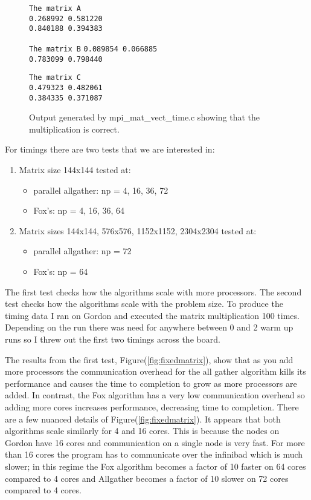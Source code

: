 \documentclass[11pt,a4paper,oneside]{report}
\begin{document}
\begin{figure}[htpb]
  \texttt{The matrix A\\}
  \texttt{0.268992 0.581220 \\}
  \texttt{0.840188 0.394383 \\}

  \texttt{The matrix B}
  \texttt{0.089854 0.066885 \\}
  \texttt{0.783099 0.798440 \\}

  \texttt{The matrix C\\}
  \texttt{0.479323 0.482061 \\}
  \texttt{0.384335 0.371087 \\}
  \caption{Output generated by mpi\_mat\_vect\_time.c showing that the multiplication is correct.}
  \label{fig:allgather}
\end{figure}

\pagebreak

For timings there are two tests that we are interested in:
\begin{enumerate}
  \item Matrix size 144x144 tested at:
    \begin{itemize}
      \item parallel allgather: np = 4, 16, 36, 72
      \item Fox’s: np = 4, 16, 36, 64
    \end{itemize}
  \item Matrix sizes 144x144, 576x576, 1152x1152, 2304x2304 tested at:
    \begin{itemize}
      \item parallel allgather: np = 72
      \item Fox’s: np = 64
    \end{itemize}
\end{enumerate}

The first test checks how the algorithms scale with more processors.  The second test checks how the algorithms scale with the problem size.  To produce the timing data I ran on Gordon and executed the matrix multiplication 100 times.  Depending on the run there was need for anywhere between 0 and 2 warm up runs so I threw out the first two timings across the board.

The results from the first test, Figure(\ref{fig:fixedmatrix}), show that as you add more processors the communication overhead for the all gather algorithm kills its performance and causes the time to completion to grow as more processors are added.  In contrast, the Fox algorithm has a very low communication overhead so adding more cores increases performance, decreasing time to completion.  There are a few nuanced details of Figure(\ref{fig:fixedmatrix}).  It appears that both algorithms scale similarly for 4 and 16 cores.  This is because the nodes on Gordon have 16 cores and communication on a single node is very fast.  For more than 16 cores the program has to communicate over the infinibad which is much slower; in this regime the Fox algorithm becomes a factor of 10 faster on 64 cores compared to 4 cores and Allgather becomes a factor of 10 slower on 72 cores compared to 4 cores.
\end{document}
